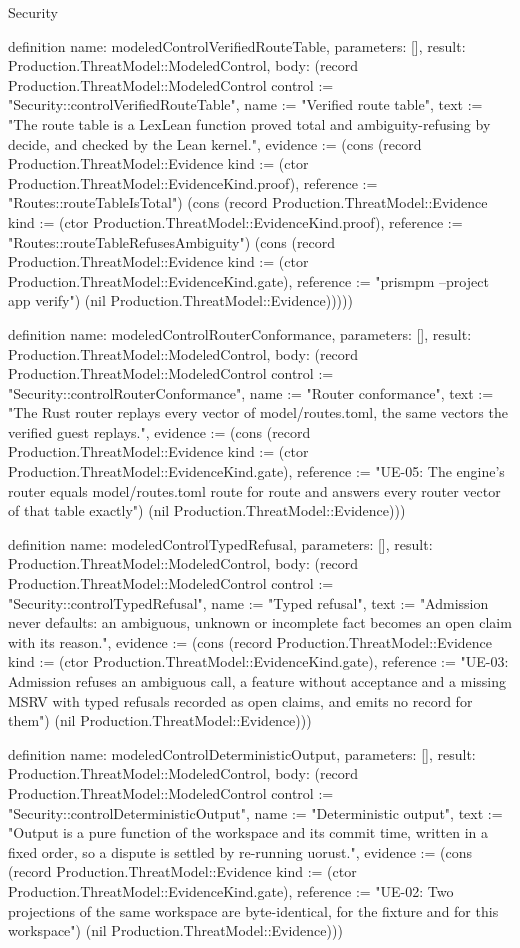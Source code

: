 \begin{lexlean}{Security}
\begin{semanticmodule}
definition{
  name: modeledControlVerifiedRouteTable,
  parameters: [],
  result: Production.ThreatModel::ModeledControl,
  body: (record Production.ThreatModel::ModeledControl {control := "Security::controlVerifiedRouteTable", name := "Verified route table", text := "The route table is a LexLean function proved total and ambiguity-refusing by decide, and checked by the Lean kernel.", evidence := (cons (record Production.ThreatModel::Evidence {kind := (ctor Production.ThreatModel::EvidenceKind.proof), reference := "Routes::routeTableIsTotal"}) (cons (record Production.ThreatModel::Evidence {kind := (ctor Production.ThreatModel::EvidenceKind.proof), reference := "Routes::routeTableRefusesAmbiguity"}) (cons (record Production.ThreatModel::Evidence {kind := (ctor Production.ThreatModel::EvidenceKind.gate), reference := "prismpm --project app verify"}) (nil Production.ThreatModel::Evidence))))})
}

definition{
  name: modeledControlRouterConformance,
  parameters: [],
  result: Production.ThreatModel::ModeledControl,
  body: (record Production.ThreatModel::ModeledControl {control := "Security::controlRouterConformance", name := "Router conformance", text := "The Rust router replays every vector of model/routes.toml, the same vectors the verified guest replays.", evidence := (cons (record Production.ThreatModel::Evidence {kind := (ctor Production.ThreatModel::EvidenceKind.gate), reference := "UE-05: The engine's router equals model/routes.toml route for route and answers every router vector of that table exactly"}) (nil Production.ThreatModel::Evidence))})
}

definition{
  name: modeledControlTypedRefusal,
  parameters: [],
  result: Production.ThreatModel::ModeledControl,
  body: (record Production.ThreatModel::ModeledControl {control := "Security::controlTypedRefusal", name := "Typed refusal", text := "Admission never defaults: an ambiguous, unknown or incomplete fact becomes an open claim with its reason.", evidence := (cons (record Production.ThreatModel::Evidence {kind := (ctor Production.ThreatModel::EvidenceKind.gate), reference := "UE-03: Admission refuses an ambiguous call, a feature without acceptance and a missing MSRV with typed refusals recorded as open claims, and emits no record for them"}) (nil Production.ThreatModel::Evidence))})
}

definition{
  name: modeledControlDeterministicOutput,
  parameters: [],
  result: Production.ThreatModel::ModeledControl,
  body: (record Production.ThreatModel::ModeledControl {control := "Security::controlDeterministicOutput", name := "Deterministic output", text := "Output is a pure function of the workspace and its commit time, written in a fixed order, so a dispute is settled by re-running uorust.", evidence := (cons (record Production.ThreatModel::Evidence {kind := (ctor Production.ThreatModel::EvidenceKind.gate), reference := "UE-02: Two projections of the same workspace are byte-identical, for the fixture and for this workspace"}) (nil Production.ThreatModel::Evidence))})
}


\end{semanticmodule}
\end{lexlean}
